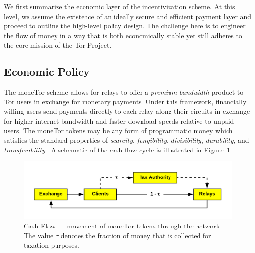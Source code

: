 
We first summarize the economic layer of the incentivization scheme. At this
level, we assume the existence of an ideally secure and efficient payment layer
and proceed to outline the high-level policy design. The challenge here is to
engineer the flow of money in a way that is both economically stable yet still
adheres to the core mission of the Tor Project.

\subsection{Economic Policy}
The moneTor scheme allows for relays to offer a \emph{premium bandwidth} product
to Tor users in exchange for monetary payments. Under this framework,
financially willing users send payments directly to each relay along their circuits
in exchange for higher internet bandwidth and faster download speeds relative to
unpaid users. %
The moneTor tokens %
may be any form of programmatic money which satisfies the standard properties of
\textit{scarcity}, \textit{fungibility}, \textit{divisibility},
\textit{durability}, and
\textit{transferability}~\cite[p.3]{crump2011phenomenon} A schematic of the cash
flow cycle is illustrated in Figure~\ref{fig:economic}.

\begin{figure}[h] \centering
  \includegraphics[trim={0.5cm, 0.5cm, 0.5cm, 0.5cm}, clip, scale=0.7]{images/economic_diagram.png}
  \caption[Cash Flow]{Cash Flow --- movement of moneTor tokens through the
    network. The value $\tau$ denotes the fraction of money that is collected
    for taxation purposes.}
  \label{fig:economic}
\end{figure}


